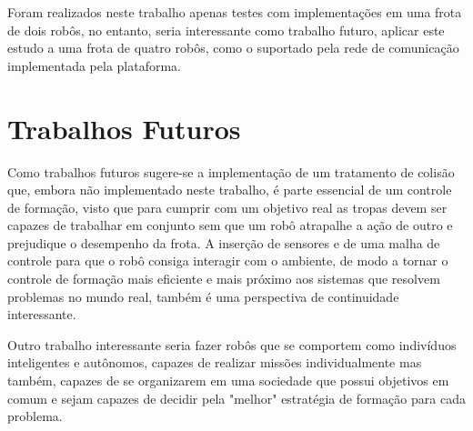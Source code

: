 Foram realizados neste trabalho apenas testes com implementações em uma frota de dois robôs, no entanto, seria interessante como trabalho futuro, aplicar este estudo a uma frota de quatro robôs, como o suportado pela rede de comunicação implementada pela plataforma. 

\section{Trabalhos Futuros}
 \label{sec:trabFuturos}
 Como trabalhos futuros sugere-se a implementação de um tratamento de colisão que, embora não implementado neste trabalho, é parte essencial de um controle de formação, visto que para cumprir com um objetivo real as tropas devem ser capazes de trabalhar em conjunto sem que um robô atrapalhe a ação de outro e prejudique o desempenho da frota. A inserção de sensores e de uma malha de controle para que o robô consiga interagir com o ambiente, de modo a tornar o controle de formação mais eficiente e mais próximo aos sistemas que resolvem problemas no mundo real, também é uma perspectiva de continuidade interessante.
 
 Outro trabalho interessante seria fazer robôs que se comportem como indivíduos inteligentes e autônomos, capazes de realizar missões individualmente mas também, capazes de se organizarem em uma sociedade que possui objetivos em comum e sejam capazes de decidir pela "melhor" estratégia de formação para cada problema.
 

